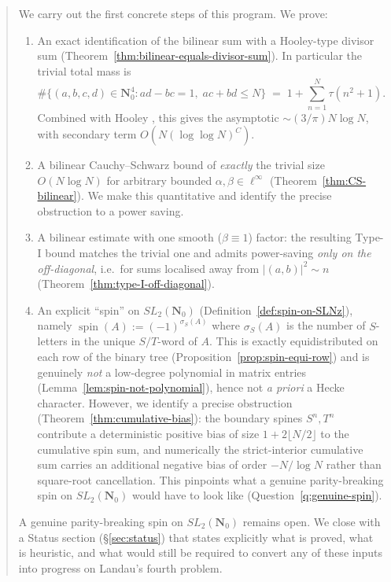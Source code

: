\documentclass[11pt]{article}
\theoremstyle{definition}
\newcommand{\Nz}{\mathbf{N}_0}
\newcommand{\SLNz}{SL_2(\Nz)}
\DeclareMathOperator{\spin}{spin}
\begin{document}
\begin{abstract}
We carry out the first concrete steps of this program. We prove:
\begin{enumerate}
\item[(i)] An exact identification of the bilinear sum with a Hooley-type
divisor sum (Theorem~\ref{thm:bilinear-equals-divisor-sum}). In particular
the trivial total mass is
\[
\#\{(a,b,c,d)\in\Nz^{4}:ad-bc=1,\;ac+bd\le N\}
\;=\;1+\sum_{n=1}^{N}\tau(n^{2}+1).
\]
Combined with Hooley \cite{hooley63}, this gives the asymptotic
$\sim(3/\pi)N\log N$, with secondary term $O(N(\log\log N)^{C})$.
\item[(ii)] A bilinear Cauchy--Schwarz bound of \emph{exactly} the trivial
size $O(N\log N)$ for arbitrary bounded $\alpha,\beta\in\ell^{\infty}$
(Theorem~\ref{thm:CS-bilinear}). We make this quantitative and identify
the precise obstruction to a power saving.
\item[(iii)] A bilinear estimate with one smooth ($\beta\equiv 1$) factor:
the resulting Type-I bound matches the trivial one and admits power-saving
\emph{only on the off-diagonal}, i.e.\ for sums localised away from
$|(a,b)|^{2}\sim n$ (Theorem~\ref{thm:type-I-off-diagonal}).
\item[(iv)] An explicit ``spin'' on $\SLNz$
(Definition~\ref{def:spin-on-SLNz}), namely
$\spin(A):=(-1)^{\sigma_{S}(A)}$ where $\sigma_{S}(A)$ is the number of
$S$-letters in the unique $S/T$-word of $A$. This is exactly
equidistributed on each row of the binary tree
(Proposition~\ref{prop:spin-equi-row}) and is genuinely \emph{not} a
low-degree polynomial in matrix entries
(Lemma~\ref{lem:spin-not-polynomial}), hence not \emph{a priori} a
Hecke character. However, we identify a precise obstruction
(Theorem~\ref{thm:cumulative-bias}): the boundary spines $S^{n},T^{n}$
contribute a deterministic positive bias of size $1+2\lfloor N/2\rfloor$
to the cumulative spin sum, and numerically the strict-interior
cumulative sum carries an additional negative bias of order $-N/\log N$
rather than square-root cancellation. This pinpoints what a genuine
parity-breaking spin on $\SLNz$ would have to look like
(Question~\ref{q:genuine-spin}).
\end{enumerate}
A genuine parity-breaking spin on $\SLNz$ remains open. We close with a
Status section (\S\ref{sec:status}) that states explicitly what is
proved, what is heuristic, and what would still be required to convert
any of these inputs into progress on Landau's fourth problem.
\end{abstract}

\tableofcontents
\end{document}
